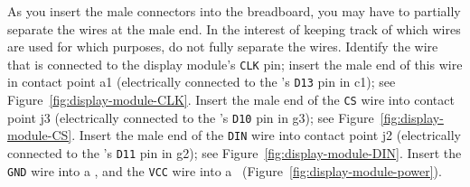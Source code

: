 As you insert the male connectors into the breadboard, you may have to partially separate the wires at the male end.
In the interest of keeping track of which wires are used for which purposes, do not fully separate the wires.
Identify the wire that is connected to the display module's \texttt{CLK} pin;
insert the male end of this wire in contact point a1 (electrically connected to the \developmentboard's \texttt{D13} pin in c1); see Figure~\ref{fig:display-module-CLK}.
Insert the male end of the \texttt{CS} wire into contact point j3 (electrically connected to the \developmentboard's \texttt{D10} pin in g3); see Figure~\ref{fig:display-module-CS}.
Insert the male end of the \texttt{DIN} wire into contact point j2 (electrically connected to the \developmentboard's \texttt{D11} pin in g2); see Figure~\ref{fig:display-module-DIN}.
Insert the \texttt{GND} wire into a \ground, and the \texttt{VCC} wire into a \power\ (Figure~\ref{fig:display-module-power}).

